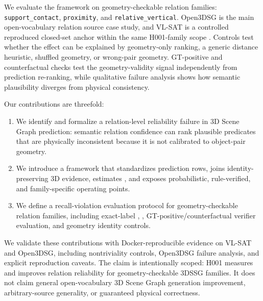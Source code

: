 We evaluate the framework on geometry-checkable relation families:
\texttt{support\_contact}, \texttt{proximity}, and
\texttt{relative\_vertical}. Open3DSG is the main open-vocabulary relation
source case study, and VL-SAT is a controlled reproduced closed-set anchor
within the same H001-family scope \cite{wang2023vlsat,koch2024open3dsg}.
Controls test
whether the effect can be explained by geometry-only ranking, a generic
distance heuristic, shuffled geometry, or wrong-pair geometry. GT-positive and
counterfactual checks test the geometry-validity signal independently from
prediction re-ranking, while qualitative failure analysis shows how semantic
plausibility diverges from physical consistency.

Our contributions are threefold:
\begin{enumerate}
    \item We identify and formalize a relation-level reliability failure in 3D
    Scene Graph prediction: semantic relation confidence can rank plausible
    predicates that are physically inconsistent because it is not calibrated to
    object-pair geometry.
    \item We introduce a \method{} framework that standardizes prediction rows,
    joins identity-preserving 3D evidence, estimates \pgeom{}, and exposes
    probabilistic, rule-verified, and family-specific operating points.
    \item We define a recall-violation evaluation protocol for
    geometry-checkable relation families, including exact-label ,
    , GT-positive/counterfactual verifier evaluation, and geometry
    identity controls.
\end{enumerate}

We validate these contributions with Docker-reproducible evidence on VL-SAT and
Open3DSG, including nontriviality controls, Open3DSG failure analysis, and
explicit reproduction caveats. The claim is intentionally scoped: H001 measures
and improves relation reliability for geometry-checkable 3DSSG families. It
does not claim general open-vocabulary 3D Scene Graph generation improvement,
arbitrary-source generality, or guaranteed physical correctness.
